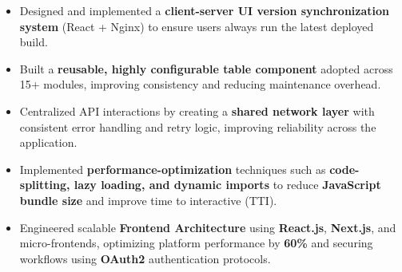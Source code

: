 \documentclass[100pt,a4paper]{article}
\begin{document}
\begin{itemize}
\item  {Designed and implemented a \textbf{client-server UI version synchronization system} (React + Nginx) to ensure users always run the latest deployed build.}
\item  {Built a \textbf{reusable, highly configurable table component} adopted across 15+ modules, improving consistency and reducing maintenance overhead.}
\item  {Centralized API interactions by creating a \textbf{shared network layer} with consistent error handling and retry logic, improving reliability across the application.}
\item {Implemented \textbf{performance-optimization} techniques such as \textbf{code-splitting, lazy loading, and dynamic imports} to reduce \textbf{JavaScript bundle size} and improve time to interactive (TTI).}
\item {Engineered scalable \textbf{Frontend Architecture} using \textbf{React.js}, \textbf{Next.js}, and micro-frontends, optimizing platform performance by \textbf{60\%} and securing workflows using \textbf{OAuth2} authentication protocols.}
\end{itemize}
\end{document}
